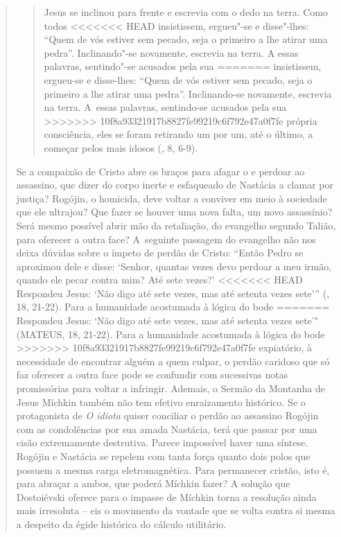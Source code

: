 {\begin{quote}
\begin{quote}
Jesus se inclinou para frente e escrevia com o dedo na terra. Como todos
<<<<<<< HEAD
insistissem, ergueu"-se e disse"-lhes: ``Quem de vós estiver sem pecado,
seja o primeiro a lhe atirar uma pedra''. Inclinando"-se novamente,
escrevia na terra. A essas palavras, sentindo"-se acusados pela sua
=======
insistissem, ergueu-se e disse-lhes: ``Quem de vós estiver sem pecado,
seja o primeiro a lhe atirar uma pedra''. Inclinando-se novamente,
escrevia na terra. A~essas palavras, sentindo-se acusados pela sua
>>>>>>> 10f8a93321917b8827fe99219c6f792e47a0f7fe
própria consciência, eles se foram retirando um por um, até o último, a
começar pelos mais idosos (, 8, 6-9).
\end{quote}

Se a compaixão de Cristo abre os braços para afagar o e perdoar ao
assassino, que dizer do corpo inerte e esfaqueado de Nastácia a clamar
por justiça? Rogójin, o homicida, deve voltar a conviver em meio à
sociedade que ele ultrajou? Que fazer se houver uma nova falta, um novo
assassínio? Será mesmo possível abrir mão da retaliação, do evangelho
segundo Talião, para oferecer a outra face? A~seguinte passagem do
evangelho não nos deixa dúvidas sobre o ímpeto de perdão de Cristo:
``Então Pedro se aproximou dele e disse: `Senhor, quantas vezes devo
perdoar a meu irmão, quando ele pecar contra mim? Até sete vezes?'
<<<<<<< HEAD
Respondeu Jesus: `Não digo até sete vezes, mas até setenta vezes sete'''
(, 18, 21-22). Para a humanidade acostumada à lógica do bode
=======
Respondeu Jesus: `Não digo até sete vezes, mas até setenta vezes sete'"
(MATEUS, 18, 21-22). Para a humanidade acostumada à lógica do bode
>>>>>>> 10f8a93321917b8827fe99219c6f792e47a0f7fe
expiatório, à necessidade de encontrar alguém a quem culpar, o perdão
caridoso que só faz oferecer a outra face pode se confundir com
sucessivas notas promissórias para voltar a infringir. Ademais, o Sermão
da Montanha de Jesus Míchkin também não tem efetivo enraizamento
histórico. Se o protagonista de \emph{O idiota} quiser conciliar o
perdão ao assassino Rogójin com as condolências por sua amada Nastácia,
terá que passar por uma cisão extremamente destrutiva. Parece impossível
haver uma síntese. Rogójin e Nastácia se repelem com tanta força quanto
dois polos que possuem a mesma carga eletromagnética. Para permanecer
cristão, isto é, para abraçar a ambos, que poderá Míchkin fazer? A
solução que Dostoiévski oferece para o impasse de Míchkin torna a
resolução ainda mais irresoluta -- eis o movimento da vontade que se
volta contra si mesma a despeito da égide histórica do cálculo
utilitário.


\end{quote}}
